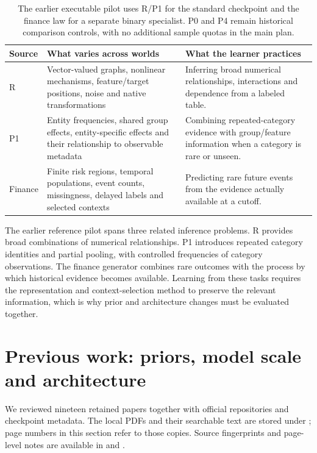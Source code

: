 \documentclass[11pt]{article}
\begin{document}
\begin{table}[ht]
\centering\small
\begin{tabularx}{\linewidth}{@{}p{.13\linewidth}p{.36\linewidth}Y@{}}
\toprule Source & What varies across worlds & What the learner practices\\
\midrule
R & Vector-valued graphs, nonlinear mechanisms, feature/target positions, noise and native transformations & Inferring broad numerical relationships, interactions and dependence from a labeled table.\\
P1 & Entity frequencies, shared group effects, entity-specific effects and their relationship to observable metadata & Combining repeated-category evidence with group/feature information when a category is rare or unseen.\\
Finance & Finite risk regions, temporal populations, event counts, missingness, delayed labels and selected contexts & Predicting rare future events from the evidence actually available at a cutoff.\\
\bottomrule
\end{tabularx}
\caption{The earlier executable pilot uses R/P1 for the standard checkpoint and the finance law for a separate binary specialist. P0 and P4 remain historical comparison controls, with no additional sample quotas in the main plan.}
\end{table}

The earlier reference pilot spans three related inference problems. R provides broad combinations of numerical relationships. P1 introduces repeated category identities and partial pooling, with controlled frequencies of category observations. The finance generator combines rare outcomes with the process by which historical evidence becomes available. Learning from these tasks requires the representation and context-selection method to preserve the relevant information, which is why prior and architecture changes must be evaluated together.


\section{Previous work: priors, model scale and architecture}
\label{sec:evidence}

We reviewed nineteen retained papers together with official repositories and checkpoint metadata. The local PDFs and their searchable text are stored under ; page numbers in this section refer to those copies. Source fingerprints and page-level notes are available in  and .
\end{document}
